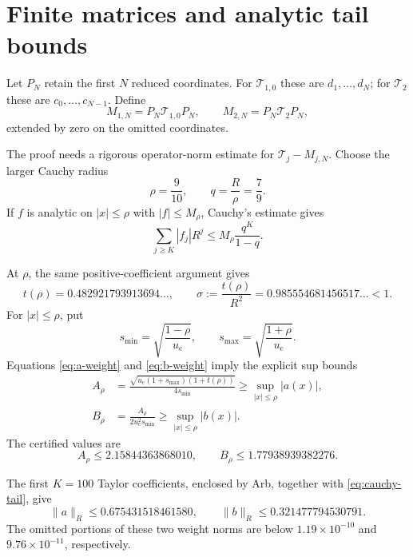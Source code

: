 \documentclass[11pt]{article}
\theoremstyle{definition}
\theoremstyle{remark}
\newcommand{\uc}{u_{\mathrm c}}
\newcommand{\cT}{\mathcal T}
\begin{document}
\section{Finite matrices and analytic tail bounds}
\label{sec:certificate-method}

Let $P_N$ retain the first $N$ reduced coordinates.  For $\cT_{1,0}$ these
are $d_1,\ldots,d_N$; for $\cT_2$ these are $c_0,\ldots,c_{N-1}$.  Define
\begin{equation}\label{eq:finite-matrices}
 M_{1,N}=P_N\cT_{1,0}P_N,
 \qquad
 M_{2,N}=P_N\cT_2P_N,
\end{equation}
extended by zero on the omitted coordinates.

The proof needs a rigorous operator-norm estimate for
$\cT_{j}-M_{j,N}$.  Choose the larger Cauchy radius
\begin{equation}\label{eq:cauchy-radius}
 \rho=\frac9{10},
 \qquad
 q=\frac R\rho=\frac79.
\end{equation}
If $f$ is analytic on $|x|\le\rho$ with $|f|\le M_\rho$, Cauchy's estimate
gives
\begin{equation}\label{eq:cauchy-tail}
 \sum_{j\ge K}|f_j|R^j
 \le M_\rho\frac{q^K}{1-q}.
\end{equation}

At $\rho$, the same positive-coefficient argument gives
\begin{equation}\label{eq:sigma}
 t(\rho)=0.482921793913694\ldots,
 \qquad
 \sigma:=\frac{t(\rho)}{R^2}
 =0.985554681456517\ldots<1.
\end{equation}
For $|x|\le\rho$, put
\begin{equation}\label{eq:s-bounds}
 s_{\min}=\sqrt{\frac{1-\rho}{\uc}},
 \qquad
 s_{\max}=\sqrt{\frac{1+\rho}{\uc}}.
\end{equation}
Equations \eqref{eq:a-weight} and \eqref{eq:b-weight} imply the explicit sup bounds
\begin{align}
 A_\rho
 &=\frac{\sqrt{\uc(1+s_{\max})(1+t(\rho))}}
 {4s_{\min}}
 \ge\sup_{|x|\le\rho}|a(x)|,
 \label{eq:A-rho}\\
 B_\rho
 &=\frac{A_\rho}{2\uc^2s_{\min}}
 \ge\sup_{|x|\le\rho}|b(x)|.
 \label{eq:B-rho}
\end{align}
The certified values are
\begin{equation}\label{eq:cauchy-values}
 A_\rho\le2.15844363868010,
 \qquad
 B_\rho\le1.77938939382276.
\end{equation}

The first $K=100$ Taylor coefficients, enclosed by Arb, together with
\eqref{eq:cauchy-tail}, give
\begin{equation}\label{eq:weight-norms}
 \|a\|_R\le0.675431518461580,
 \qquad
 \|b\|_R\le0.321477794530791.
\end{equation}
The omitted portions of these two weight norms are below
$1.19\times10^{-10}$ and $9.76\times10^{-11}$, respectively.
\end{document}

